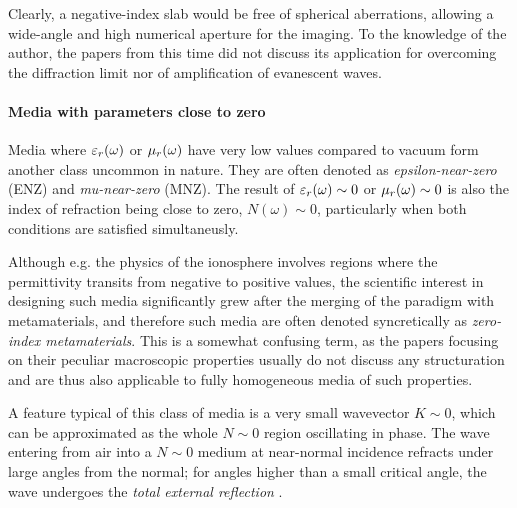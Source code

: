 Clearly, a negative-index slab would be free of spherical aberrations, allowing a wide-angle and high numerical aperture for the imaging. To the knowledge of the author, the papers from this time did not discuss its application for overcoming the diffraction limit nor of amplification of evanescent waves.  %

\paragraph{Media with parameters close to zero}%
Media where $\varepsilon_r(\omega)$ or $\mu_r(\omega)$ have very low values compared to vacuum form another class uncommon in nature. They are often denoted as \textit{epsilon-near-zero} (ENZ) and \textit{mu-near-zero} (MNZ).
The result of $\varepsilon_r(\omega)\sim 0$ or $\mu_r(\omega)\sim 0$ is also the index of refraction being close to zero, $N(\omega) \sim 0$, particularly when both conditions are satisfied simultaneusly. 

Although e.g. the physics of the ionosphere involves regions where the permittivity transits from negative to positive values, the scientific interest in designing such media significantly grew
after the merging of the paradigm with metamaterials, and therefore such media are often denoted syncretically as \textit{zero-index metamaterials}. This is a somewhat confusing term, as the papers focusing on their peculiar macroscopic properties \cite{basharin2013epsilon} 
usually do not discuss any structuration and are thus also applicable to fully homogeneous media of such properties.

A feature typical of this class of media is a very small wavevector $K\sim 0$, which can be approximated as the whole $N\sim 0$ region oscillating in phase. The wave entering from air into a $N\sim 0$ medium at near-normal incidence refracts under large angles from the normal; for angles higher than a small critical angle, the wave undergoes the \textit{total external reflection} \cite{schwartz2003total}. 


